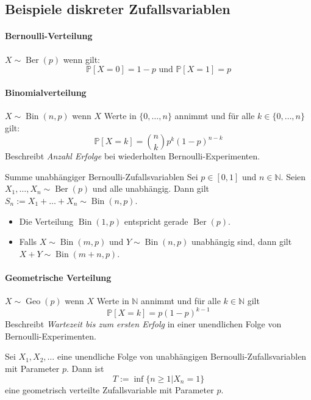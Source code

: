 \documentclass[a4paper,10pt]{article}
\def\N{\mathbb{N}}
\def\P{\mathbb{P}}
\DeclareMathOperator{\Bernoulli}{\mathrm{Ber}}
\DeclareMathOperator{\Binomial}{\mathrm{Bin}}
\DeclareMathOperator{\Geometrisch}{\mathrm{Geo}}
\begin{document}
\subsection{Beispiele diskreter Zufallsvariablen}

\paragraph{Bernoulli-Verteilung} \( X \sim \Bernoulli(p) \) wenn gilt:
\[ \P[X = 0] = 1 - p \text{ und } \P[X = 1] = p \]

\paragraph{Binomialverteilung} \( X \sim \Binomial(n, p) \) wenn \( X \) Werte in \( \{0, \dots, n\} \) annimmt und für alle \( k \in \{0, \dots, n\} \) gilt:
\[ \P[X = k] = \binom{n}{k} p^k (1 - p)^{n - k} \]
Beschreibt \emph{Anzahl Erfolge} bei wiederholten Bernoulli-Experimenten.

\begin{subbox}{Summe unabhängiger Bernoulli-Zufallsvariablen}
    Sei \( p \in [0, 1] \) und \( n \in \N \). Seien \( X_1, \dots, X_n \sim \Bernoulli(p) \) und alle unabhängig. Dann gilt \( S_n := X_1 + \dots + X_n \sim \Binomial(n, p) \).
\end{subbox}

\begin{itemize}
    \item Die Verteilung \( \Binomial(1, p) \) entspricht gerade \( \Bernoulli(p) \).
    \item Falls \( X \sim \Binomial(m, p) \) und \( Y \sim \Binomial(n, p) \) unabhängig sind, dann gilt \( X + Y \sim \Binomial(m + n, p) \).
\end{itemize}

\paragraph{Geometrische Verteilung} \( X \sim \Geometrisch(p) \) wenn \( X \) Werte in \( \N \) annimmt und für alle \( k \in \N \) gilt
\[ \P[X = k] = p(1 - p)^{k - 1} \]
Beschreibt \emph{Wartezeit bis zum ersten Erfolg} in einer unendlichen Folge von Bernoulli-Experimenten.

\begin{subbox}{}
    Sei \( X_1, X_2, \dots \) eine unendliche Folge von unabhängigen Bernoulli-Zufallsvariablen mit Parameter \( p \). Dann ist
    \[ T := \inf\{n \geq 1 | X_n = 1\} \]
    eine geometrisch verteilte Zufallsvariable mit Parameter \( p \).
\end{subbox}
\end{document}
